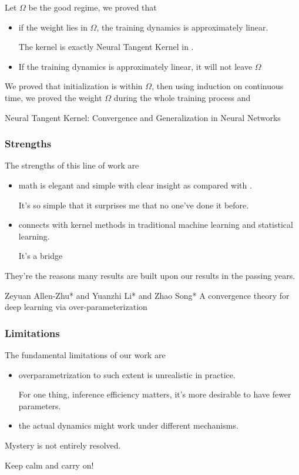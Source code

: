 \documentclass{beamer}   	%
\theoremstyle{definition}
\begin{document}
\begin{frame}
Let $\Omega$ be the good regime, we proved that
\begin{itemize}
	\item if the weight lies in $\Omega$, the training dynamics is approximately linear.

	The kernel is exactly Neural Tangent Kernel in \cite{ntk}.
	\item If the training dynamics is approximately linear, it will not leave $\Omega$
\end{itemize}

We proved that initialization is within $\Omega$, then using induction on continuous time, we proved the weight $\Omega$ during the whole training process and 
\begin{thebibliography}{9}
\scriptsize
{}
	Neural Tangent Kernel: Convergence and Generalization in Neural Networks
\end{thebibliography}
\end{frame}

\begin{frame}
\frametitle{Strengths}
The strengths of this line of work are
\begin{itemize}
	\item math is elegant and simple with clear insight as compared with \cite{yzl}.

	It's so simple that it surprises me that no one've done it before.
	\item connects with kernel methods in traditional machine learning and statistical learning.

	It's a bridge 
\end{itemize}

They're the reasons many results are built upon our results in the passing years.
\begin{thebibliography}{9}
\scriptsize
{} 
Zeyuan Allen-Zhu* and Yuanzhi Li* and Zhao Song*
A convergence theory for deep learning via over-parameterization
\end{thebibliography}
\end{frame}

\begin{frame}
\frametitle{Limitations}
The fundamental limitations of our work are
\begin{itemize}
	\item overparametrization to such extent is unrealistic in practice.

	For one thing, inference efficiency matters, it's more desirable to have fewer parameters.
	\item the actual dynamics might work under different mechanisms.
\end{itemize}

\vspace{5mm}

\vspace{5mm}

Mystery is not entirely resolved.

Keep calm and carry on!
\end{frame}
\end{document}
